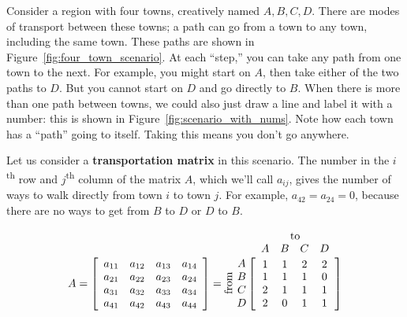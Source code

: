 \documentclass[../textbook.tex]{subfiles}
\begin{document}
Consider a region with four towns, creatively named $A,B,C,D$. There are modes of transport between these towns; a path can go from a town to any town, including the same town. These paths are shown in Figure~\ref{fig:four_town_scenario}. At each ``step,'' you can take any path from one town to the next. For example, you might start on $A$, then take either of the two paths to $D$. But you cannot start on $D$ and go directly to $B$. When there is more than one path between towns, we could also just draw a line and label it with a number: this is shown in Figure~\ref{fig:scenario_with_nums}. Note how each town has a ``path'' going to itself. Taking this means you don't go anywhere.

Let us consider a \textbf{transportation matrix} in this scenario. The number in the $i$\textsuperscript{th} row and $j$\textsuperscript{th} column of the matrix $A$, which we'll call $a_{ij}$, gives the number of ways to walk directly from town $i$ to town $j$. For example, $a_{42} = a_{24} = 0$, because there are no ways to get from $B$ to $D$ or $D$ to $B$.

$$
  A = \left[\begin{array}{cccc}
  a_{11} & a_{12} & a_{13} & a_{14} \\
a_{21} & a_{22} & a_{23} & a_{24} \\
a_{31} & a_{32} & a_{33} & a_{34} \\
a_{41} & a_{42} & a_{43} & a_{44} \\
  \end{array}\right] =
  \rotatebox[origin=c]{90}{from}\;\,
  \begin{array}{@{}c@{}}
    \rowind{A} \\ \rowind{B} \\ \rowind{C} \\ \rowind{D}
  \end{array}
  \mathop{\left[
  \begin{array}{cccc}
     \colind{1}{A}  &  \colind{1}{B}  &  \colind{2}{C}  & \colind{2}{D} \\
1 & 1 & 1 & 0 \\
2 & 1 & 1 & 1 \\
2 & 0 & 1 & 1 \\
  \end{array}
  \right]}^{
  \begin{array}{@{}c@{}}
    \rowind{\text{to}} \\ \mathstrut
  \end{array}
  }
$$
\end{document}

